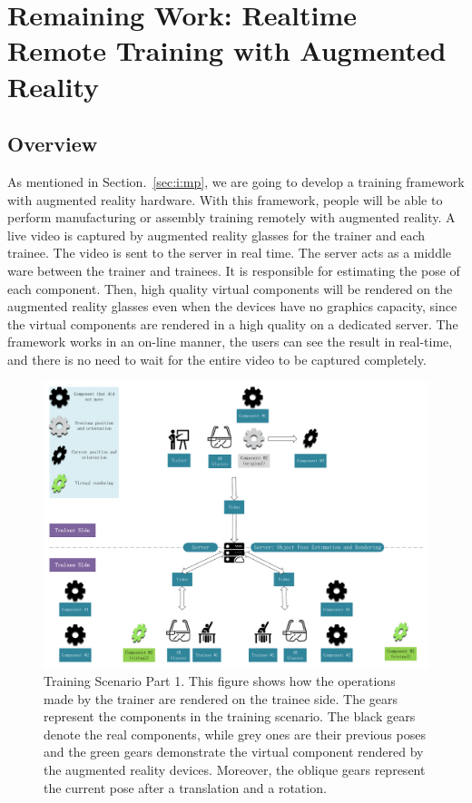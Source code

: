 \chapter{Remaining Work: Realtime Remote Training with Augmented Reality}
\label{chap:rrtar}

\section{Overview}

As mentioned in Section.~\ref{sec:i:mp}, we are going to develop a training framework with augmented reality hardware. With this framework, people will be able to perform manufacturing or assembly training remotely with augmented reality.
A live video is captured by augmented reality glasses for the trainer and each trainee. The video is sent to the server in real time. The server acts as a middle ware between the trainer and trainees. It is responsible for estimating the pose of each component.
Then, high quality virtual components will be rendered on the augmented reality glasses even when the devices have no graphics capacity, since the virtual components are rendered in a high quality on a dedicated server. The framework works in an on-line manner, the users can see the result in real-time, and there is no need to wait for the entire video to be captured completely.

\begin{figure}
	\centering
	\includegraphics[width=\textwidth]{figures/scenario1.pdf}
	\caption{Training Scenario Part 1. This figure shows how the operations made by the trainer are rendered on the trainee side. The gears represent the components in the training scenario. The black gears denote the real components, while grey ones are their previous poses and the green gears demonstrate the virtual component rendered by the augmented reality devices. Moreover, the oblique gears represent the current pose after a translation and a rotation.}
	\label{fig-scenario1}
\end{figure}

